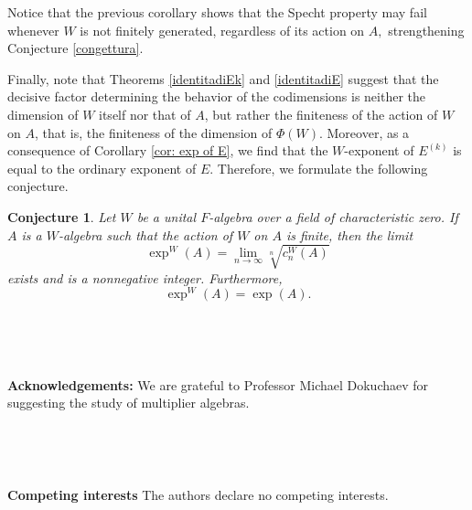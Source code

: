 \documentclass[reqno]{amsart}
\newtheorem{conjecture}[theorem]{Conjecture}
\theoremstyle{definition}
\numberwithin{equation}{section}
\numberwithin{theorem}{section}
\begin{document}
Notice that the previous corollary shows that the Specht property may fail whenever $W$ is not finitely generated, regardless of its action on $A,$ strengthening Conjecture \ref{congettura}.


\smallskip


Finally, note that Theorems \ref{identitadiEk} and \ref{identitadiE} suggest that the decisive factor determining the behavior of the codimensions is neither the dimension of $W$ itself nor that of $A$, but rather the finiteness of the action of $W$ on $A$, that is, the finiteness of the dimension of $\Phi(W)$. Moreover, as a consequence of Corollary \ref{cor: exp of E}, we find that the $W$-exponent of $E^{(k)}$ is equal to the ordinary exponent of $E$. Therefore, we formulate the following conjecture.

\begin{conjecture}\label{congettura2}
    Let $W$ be a unital $F$-algebra over a field of characteristic zero. If $A$ is a $W$-algebra such that the action of $W$ on $A$ is finite, then the limit 
    $$\exp^W(A)=\lim_{n\to \infty}\sqrt[n]{c_n^W(A)}$$
    exists and is a nonnegative integer. Furthermore, 
   $$\exp^W(A)=\exp(A).$$
\end{conjecture}



\

\

\noindent\textbf{Acknowledgements:} We are grateful to Professor Michael Dokuchaev for suggesting the study of multiplier algebras.

\

\

\noindent \textbf{Competing interests} The authors declare no competing interests.
\end{document}
